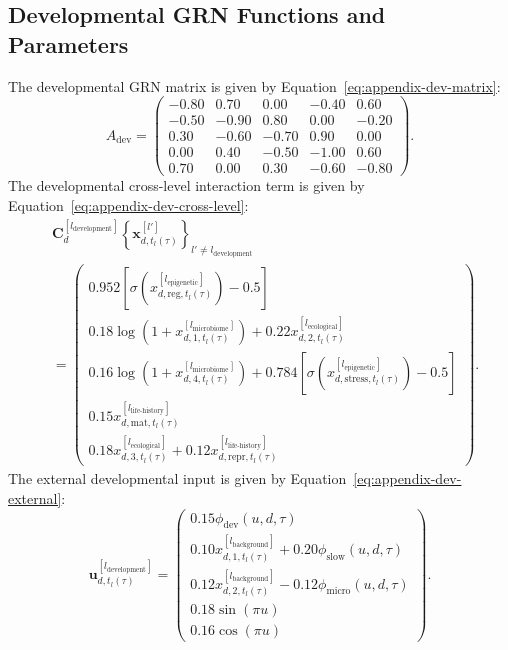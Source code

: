 \documentclass[11pt]{article}
\begin{document}
\subsection{Developmental GRN Functions and Parameters}
The developmental GRN matrix is given by Equation~\ref{eq:appendix-dev-matrix}:
\begin{equation}
A_{\mathrm{dev}}
=
\begin{pmatrix}
-0.80 & 0.70 & 0.00 & -0.40 & 0.60\\
-0.50 & -0.90 & 0.80 & 0.00 & -0.20\\
0.30 & -0.60 & -0.70 & 0.90 & 0.00\\
0.00 & 0.40 & -0.50 & -1.00 & 0.60\\
0.70 & 0.00 & 0.30 & -0.60 & -0.80
\end{pmatrix}.
\label{eq:appendix-dev-matrix}
\end{equation}
The developmental cross-level interaction term is given by Equation~\ref{eq:appendix-dev-cross-level}:
\begin{equation}
\begin{aligned}
&\mathbf{C}_{d}^{[l_{\mathrm{development}}]}
\left\{
\mathbf{x}_{d,t_l(\tau)}^{[l']}
\right\}_{l'\neq l_{\mathrm{development}}}
\\
&=
\begin{pmatrix}
0.952\!\left[\sigma\!\left(x^{[l_{\mathrm{epigenetic}}]}_{d,\mathrm{reg},t_l(\tau)}\right)-0.5\right]\\
0.18\log\!\left(1+x^{[l_{\mathrm{microbiome}}]}_{d,1,t_l(\tau)}\right)
+0.22x^{[l_{\mathrm{ecological}}]}_{d,2,t_l(\tau)}\\
0.16\log\!\left(1+x^{[l_{\mathrm{microbiome}}]}_{d,4,t_l(\tau)}\right)
+0.784\!\left[\sigma\!\left(x^{[l_{\mathrm{epigenetic}}]}_{d,\mathrm{stress},t_l(\tau)}\right)-0.5\right]\\
0.15x^{[l_{\mathrm{life\text{-}history}}]}_{d,\mathrm{mat},t_l(\tau)}\\
0.18x^{[l_{\mathrm{ecological}}]}_{d,3,t_l(\tau)}
+0.12x^{[l_{\mathrm{life\text{-}history}}]}_{d,\mathrm{repr},t_l(\tau)}
\end{pmatrix}.
\end{aligned}
\label{eq:appendix-dev-cross-level}
\end{equation}
The external developmental input is given by Equation~\ref{eq:appendix-dev-external}:
\begin{equation}
\mathbf{u}^{[l_{\mathrm{development}}]}_{d,t_l(\tau)}
=
\begin{pmatrix}
0.15\phi_{\mathrm{dev}}(u,d,\tau)\\
0.10x^{[l_{\mathrm{background}}]}_{d,1,t_l(\tau)}
+0.20\phi_{\mathrm{slow}}(u,d,\tau)\\
0.12x^{[l_{\mathrm{background}}]}_{d,2,t_l(\tau)}
-0.12\phi_{\mathrm{micro}}(u,d,\tau)\\
0.18\sin(\pi u)\\
0.16\cos(\pi u)
\end{pmatrix}.
\label{eq:appendix-dev-external}
\end{equation}
\end{document}
